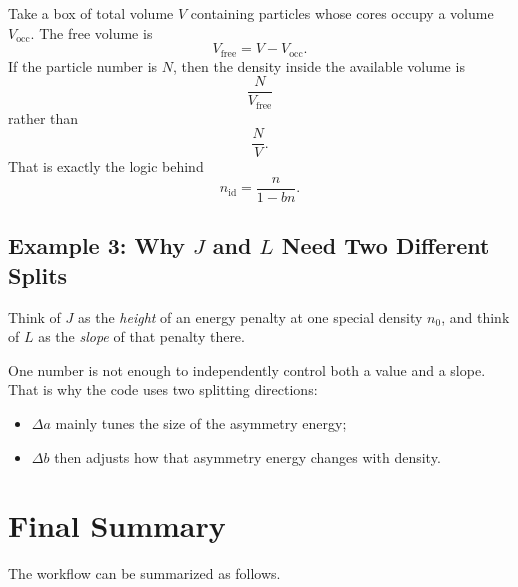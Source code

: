 \documentclass[11pt]{article}
\begin{document}
Take a box of total volume $V$ containing particles whose cores occupy a volume
$V_{\mathrm{occ}}$. The free volume is
\[
V_{\mathrm{free}}=V-V_{\mathrm{occ}}.
\]
If the particle number is $N$, then the density inside the available volume is
\[
\frac{N}{V_{\mathrm{free}}}
\]
rather than
\[
\frac{N}{V}.
\]
That is exactly the logic behind
\[
n_{\mathrm{id}}=\frac{n}{1-bn}.
\]

\subsection{Example 3: Why \texorpdfstring{$J$}{J} and \texorpdfstring{$L$}{L} Need Two Different Splits}

Think of $J$ as the \emph{height} of an energy penalty at one special density
$n_0$, and think of $L$ as the \emph{slope} of that penalty there.

One number is not enough to independently control both a value and a slope.
That is why the code uses two splitting directions:
\begin{itemize}
\item $\Delta a$ mainly tunes the size of the asymmetry energy;
\item $\Delta b$ then adjusts how that asymmetry energy changes with density.
\end{itemize}

\section{Final Summary}

The workflow can be summarized as follows.
\end{document}
